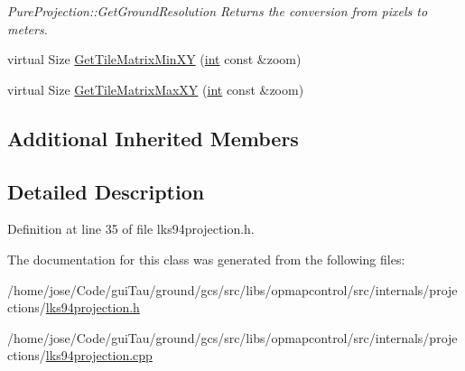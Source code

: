 \begin{DoxyCompactItemize}
\begin{DoxyCompactList}\small\item\em Pure\-Projection\-::\-Get\-Ground\-Resolution Returns the conversion from pixels to meters. \end{DoxyCompactList}\item 
virtual Size \hyperlink{group___o_p_map_widget_ga86d31a1ce953b8c93d0ee6b7dd4d7db6}{Get\-Tile\-Matrix\-Min\-X\-Y} (\hyperlink{ioapi_8h_a787fa3cf048117ba7123753c1e74fcd6}{int} const \&zoom)
\item 
virtual Size \hyperlink{group___o_p_map_widget_gaa838d53afb098ce93a50200bf0f79dec}{Get\-Tile\-Matrix\-Max\-X\-Y} (\hyperlink{ioapi_8h_a787fa3cf048117ba7123753c1e74fcd6}{int} const \&zoom)
\end{DoxyCompactItemize}
\subsection*{Additional Inherited Members}


\subsection{Detailed Description}


Definition at line 35 of file lks94projection.\-h.



The documentation for this class was generated from the following files\-:\begin{DoxyCompactItemize}
\item 
/home/jose/\-Code/gui\-Tau/ground/gcs/src/libs/opmapcontrol/src/internals/projections/\hyperlink{lks94projection_8h}{lks94projection.\-h}\item 
/home/jose/\-Code/gui\-Tau/ground/gcs/src/libs/opmapcontrol/src/internals/projections/\hyperlink{lks94projection_8cpp}{lks94projection.\-cpp}\end{DoxyCompactItemize}
